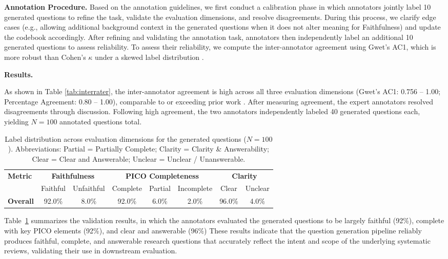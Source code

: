 \documentclass{article}
\newcommand{\xhdr}[1]{%
  \noindent\textbf{#1.}
}
\begin{document}
\xhdr{Annotation Procedure} Based on the annotation guidelines, we first conduct a calibration phase in which annotators jointly label 10 generated questions to refine the task, validate the evaluation dimensions, and resolve disagreements. During this process, we clarify edge cases (e.g., allowing additional background context in the generated questions when it does not alter meaning for Faithfulness) and update the codebook accordingly. After refining and validating the annotation task, annotators then independently label an additional 10 generated questions to assess reliability. To assess their reliability, we compute the inter-annotator agreement using Gwet's AC1, which is more robust than Cohen's $\kappa$ under a skewed label distribution \cite{wongpakaran2013comparison, ohyama2021statistical}.


\xhdr{Results}
As shown in Table \ref{tab:interrater}, the inter-annotator agreement is high across all three evaluation dimensions (Gwet's AC1: 0.756 -- 1.00; Percentage Agreement: 0.80 -- 1.00), comparable to or exceeding prior work \cite{kaur2025whosaskingsimulatingrolebased, park-etal-2024-valuescope}. After measuring agreement, the expert annotators resolved disagreements through discussion. Following high agreement, the two annotators independently labeled 40 generated questions each, yielding $N=100$ annotated questions total. 

\begin{table}[t!]
\centering
\small
\caption{Label distribution across evaluation dimensions for the generated questions ($N=100$). Abbreviations: Partial = Partially Complete; Clarity = Clarity \& Answerability; Clear = Clear and Answerable; Unclear = Unclear / Unanswerable.}
\setlength{\tabcolsep}{4pt}
\begin{tabular}{lccccc c c}
\toprule
\textbf{Metric} 
& \multicolumn{2}{c}{\textbf{Faithfulness}} 
& \multicolumn{3}{c}{\textbf{PICO Completeness}} 
& \multicolumn{2}{c}{\textbf{Clarity}} \\
\cmidrule(lr){2-3} \cmidrule(lr){4-6} \cmidrule(lr){7-8}
& Faithful & Unfaithful & Complete & Partial & Incomplete & Clear & Unclear \\
\midrule
\textbf{Overall} 
& 92.0\% & 8.0\% 
& 92.0\% & 6.0\% & 2.0\% 
& 96.0\% & 4.0\% \\
\bottomrule
\end{tabular}
\label{tab:generated-question-validation}
\end{table}

Table~\ref{tab:generated-question-validation} summarizes the validation results, in which the annotators evaluated the generated questions to be largely faithful (92\%), complete with key PICO elements (92\%), and clear and answerable (96\%) These results indicate that the question generation pipeline reliably produces faithful, complete, and answerable research questions that accurately reflect the intent and scope of the underlying systematic reviews, validating their use in downstream evaluation. 
\end{document}

